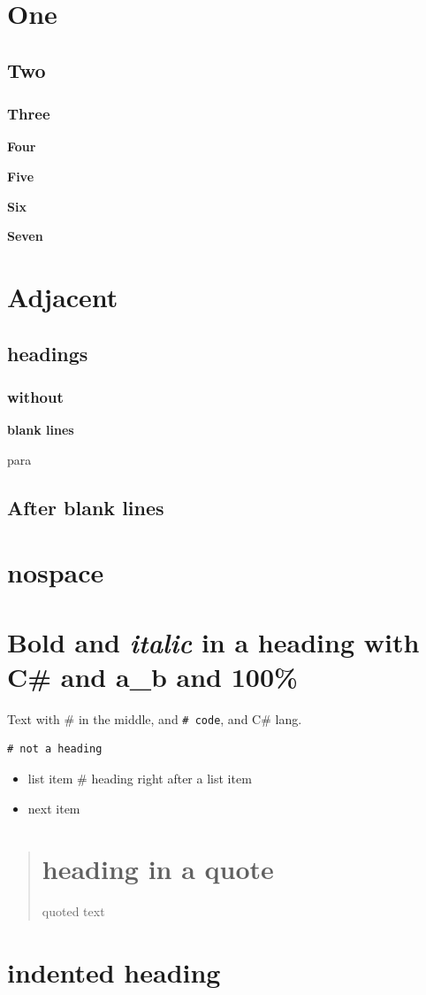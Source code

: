 \section{One}
\subsection{Two}
\subsubsection{Three}

\noindent{}\textbf{Four}

\noindent{}\textbf{Five}

\noindent{}\textbf{Six}

\noindent{}\textbf{Seven}

\section{Adjacent}
\subsection{headings}
\subsubsection{without}

\noindent{}\textbf{blank lines}

para
\subsection{After blank lines}

\section{nospace}

\section{\textbf{Bold} and \textit{italic} in a heading with C\# and a\_b and 100\%}

Text with \# in the middle, and \texttt{# code}, and C\# lang.

\begin{listing}[H]
\begin{verbatim}
# not a heading
\end{verbatim}
\end{listing}

\begin{itemize}
\item list item \# heading right after a list item
\item next item 
\end{itemize}

\begin{quotation}
\section{heading in a quote}

  quoted text
\end{quotation}
\section{indented heading}

